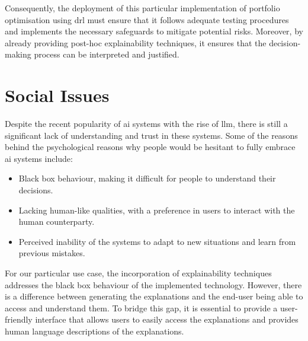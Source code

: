 Consequently, the deployment of this particular implementation of portfolio optimisation using \acrfull{drl} must ensure that it follows adequate testing procedures and implements the necessary safeguards to mitigate potential risks. Moreover, by already providing post-hoc explainability techniques, it ensures that the decision-making process can be interpreted and justified. 

\section{Social Issues} \label{sec:social-issues}

Despite the recent popularity of \acrfull{ai} systems with the rise of \acrfull{llm}, there is still a significant lack of understanding and trust in these systems. Some of the reasons behind the psychological reasons why people would be hesitant to fully embrace \acrshort{ai} systems include:
\begin{itemize}
    \item Black box behaviour, making it difficult for people to understand their decisions.
    \item Lacking human-like qualities, with a preference in users to interact with the human counterparty.
    \item Perceived inability of the systems to adapt to new situations and learn from previous mistakes.
\end{itemize}

For our particular use case, the incorporation of explainability techniques addresses the black box behaviour of the implemented technology. However, there is a difference between generating the explanations and the end-user being able to access and understand them. To bridge this gap, it is essential to provide a user-friendly interface that allows users to easily access the explanations and provides human language descriptions of the explanations. 


